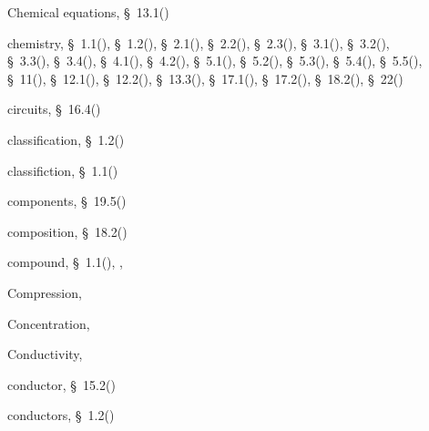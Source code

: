 \begin{multicols}{2}
{\begin{description}
	  \item[] \noindent\raggedright Chemical equations,  \S~13.1(\pageref{m38721})
	  
	  \item[] \noindent\raggedright chemistry,  \S~1.1(\pageref{m38708}),  \S~1.2(\pageref{m38706}),  \S~2.1(\pageref{m38736}),  \S~2.2(\pageref{m38734}),  \S~2.3(\pageref{m38730}),  \S~3.1(\pageref{m38756}),  \S~3.2(\pageref{m38745}),  \S~3.3(\pageref{m38753}),  \S~3.4(\pageref{m38741}),  \S~4.1(\pageref{m38760}),  \S~4.2(\pageref{m38757}),  \S~5.1(\pageref{m38704}),  \S~5.2(\pageref{m38701}),  \S~5.3(\pageref{m38684}),  \S~5.4(\pageref{m38694}),  \S~5.5(\pageref{m38689}),  \S~11(\pageref{m38120}),  \S~12.1(\pageref{m38709}),  \S~12.2(\pageref{m38711}),  \S~13.3(\pageref{m38727}),  \S~17.1(\pageref{m38720}),  \S~17.2(\pageref{m38719}),  \S~18.2(\pageref{m38712}),  \S~22(\pageref{m38138})
	  
	  \item[] \noindent\raggedright circuits,  \S~16.4(\pageref{m38776})
	  
	  \item[] \noindent\raggedright classification,  \S~1.2(\pageref{m38706})
	  
	  \item[] \noindent\raggedright classifiction,  \S~1.1(\pageref{m38708})
	  
	  \item[] \noindent\raggedright components,  \S~19.5(\pageref{m38819})
	  
	  \item[] \noindent\raggedright composition,  \S~18.2(\pageref{m38712})
	  
	  \item[] \noindent\raggedright compound,  \S~1.1(\pageref{m38708}),  \pageref{id2406453},  \pageref{id2456442}
	  
	  \item[] \noindent\raggedright Compression,  \pageref{id2399629}
	  
	  \item[] \noindent\raggedright Concentration,  \pageref{id2504991}
	  
	  \item[] \noindent\raggedright Conductivity,  \pageref{id2491504}
	  
	  \item[] \noindent\raggedright conductor,  \S~15.2(\pageref{m38781})
	  
	  \item[] \noindent\raggedright conductors,  \S~1.2(\pageref{m38706})
	  

\end{description}}
\end{multicols}
